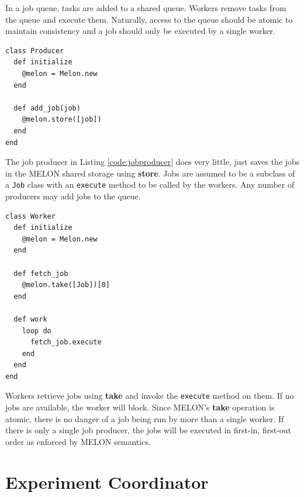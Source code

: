 In a job queue, tasks are added to a shared queue. Workers remove tasks from the queue and execute them. Naturally, access to the queue should be atomic to maintain consistency and a job should only be executed by a single worker.

\begin{lstlisting}[caption={Job Producer}, label={code:jobproducer}]
class Producer
  def initialize
    @melon = Melon.new
  end

  def add_job(job)
    @melon.store([job])
  end
end
\end{lstlisting}

The job producer in Listing \ref{code:jobproducer} does very little, just saves the jobs in the MELON shared storage using \textbf{store}. Jobs are assumed to be a subclass of a \texttt{Job} class with an \texttt{execute} method to be called by the workers. Any number of producers may add jobs to the queue.

\begin{lstlisting}[caption={Worker}, label={code:worker}]
class Worker 
  def initialize
    @melon = Melon.new
  end

  def fetch_job
    @melon.take([Job])[0]
  end

  def work
    loop do
      fetch_job.execute
    end
  end
end
\end{lstlisting}

Workers retrieve jobs using \textbf{take} and invoke the \texttt{execute} method on them. If no jobs are available, the worker will block. Since MELON's \textbf{take} operation is atomic, there is no danger of a job being run by more than a single worker. If there is only a single job producer, the jobs will be executed in first-in, first-out order as enforced by MELON semantics.

\section{Experiment Coordinator}

